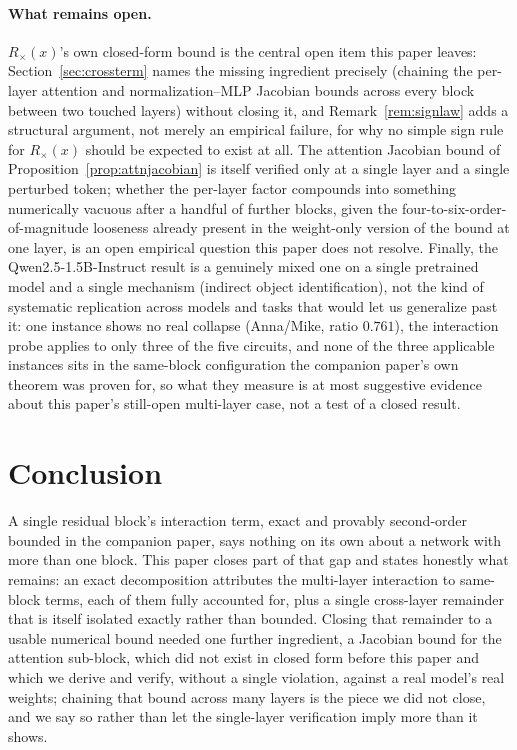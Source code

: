 \documentclass[11pt,a4paper]{article}
\begin{document}
\paragraph{What remains open.} $R_\times(x)$'s own closed-form bound is the
central open item this paper leaves: Section~\ref{sec:crossterm} names the
missing ingredient precisely (chaining the per-layer attention and
normalization--MLP Jacobian bounds across every block between two touched
layers) without closing it, and Remark~\ref{rem:signlaw} adds a structural
argument, not merely an empirical failure, for why no simple sign rule for
$R_\times(x)$ should be expected to exist at all. The attention Jacobian
bound of Proposition~\ref{prop:attnjacobian} is itself verified only at a
single layer and a single perturbed token; whether the per-layer factor
compounds into something numerically vacuous after a handful of further
blocks, given the four-to-six-order-of-magnitude looseness already present
in the weight-only version of the bound at one layer, is an open empirical
question this paper does not resolve. Finally, the Qwen2.5-1.5B-Instruct
result is a genuinely mixed one on a single pretrained model and a single
mechanism (indirect object identification), not the kind of systematic
replication across models and tasks that would let us generalize past it:
one instance shows no real collapse (Anna/Mike, ratio $0.761$), the
interaction probe applies to only three of the five circuits, and none of
the three applicable instances sits in the same-block configuration the
companion paper's own theorem was proven for, so what they measure is at
most suggestive evidence about this paper's still-open multi-layer case,
not a test of a closed result.

\section{Conclusion}
\label{sec:conclusion}

A single residual block's interaction term, exact and provably second-order
bounded in the companion paper, says nothing on its own about a network with
more than one block. This paper closes part of that gap and states honestly
what remains: an exact decomposition attributes the multi-layer interaction
to same-block terms, each of them fully accounted for, plus a single
cross-layer remainder that is itself isolated exactly rather than bounded.
Closing that remainder to a usable numerical bound needed one further
ingredient, a Jacobian bound for the attention sub-block, which did not
exist in closed form before this paper and which we derive and verify,
without a single violation, against a real model's real weights; chaining
that bound across many layers is the piece we did not close, and we say so
rather than let the single-layer verification imply more than it shows.
\end{document}
